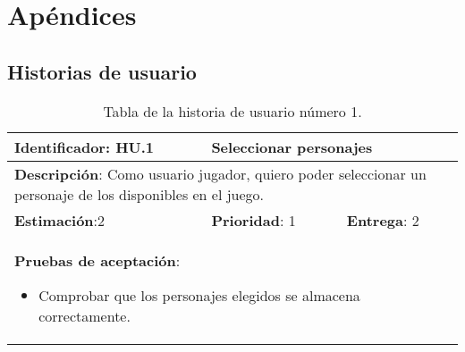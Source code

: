 \chapter{Apéndices}
\label{ch:apendices}


\section{Historias de usuario} \label{historias-usuario}

\begin{table}[h]
  \begin{center}
    \begin{tabular}{|p{4cm}|p{4cm}|p{4cm}|}

    \hline
    \textbf{Identificador}: HU.1
    & \multicolumn{2}{p{8cm}|}{Seleccionar personajes}\\

    \hline
    \multicolumn{3}{|p{12cm}|}{\textbf{Descripción}: Como usuario jugador, quiero poder seleccionar un personaje de los disponibles en el juego.}\\

    \hline
    \textbf{Estimación}:2
    & \textbf{Prioridad}: 1
    & \textbf{Entrega}: 2\\

    \hline
    \multicolumn{3}{|p{12cm}|}{\textbf{Pruebas de aceptación}:
      \begin{itemize}
        \item Comprobar que los personajes elegidos se almacena correctamente.
      \end{itemize}
    }\\

    \hline

    \end{tabular}

    \caption{Tabla de la historia de usuario número 1.}
    \label{tabla-hu1}

  \end{center}
\end{table}

